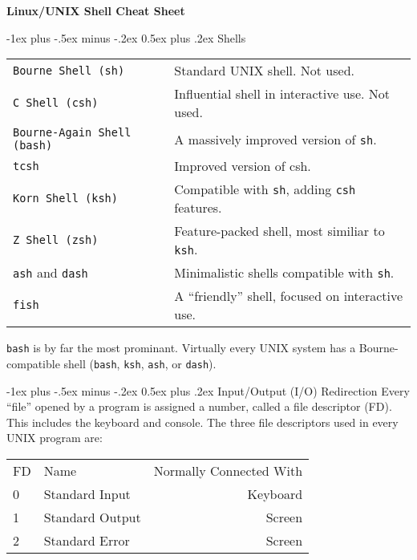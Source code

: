 \documentclass[10pt,letterpaper]{article}
\makeatletter
\renewcommand{\section}{\@startsection{section}{1}{0mm}%
                                {-1ex plus -.5ex minus -.2ex}%
                                {0.5ex plus .2ex}%
                                {\normalfont\large\bfseries}}
\makeatother
\begin{document}
\raggedright
\footnotesize
\begin{multicols}{2}

\setlength{\premulticols}{1pt}
\setlength{\postmulticols}{1pt}
\setlength{\multicolsep}{1pt}
\setlength{\columnsep}{2pt}

\begin{center}
     \Large{\textbf{Linux/UNIX Shell Cheat Sheet}} \\
\end{center}


\section{Shells}
\begin{tabular}{@{}ll@{}}
\verb!Bourne Shell (sh)! & Standard UNIX shell. Not used.\\
\verb!C Shell (csh)! & Influential shell in interactive use. Not used.\\
\verb!Bourne-Again Shell (bash)! & A massively improved version of \verb|sh|.\\
\verb!tcsh! & Improved version of csh.\\
\verb!Korn Shell (ksh)! & Compatible with \verb!sh!, adding \verb!csh! features.\\
\verb!Z Shell (zsh)! & Feature-packed shell, most similiar to \verb!ksh!.\\
\verb!ash! and \verb!dash! & Minimalistic shells compatible with \verb!sh!.\\
\verb!fish! & A ``friendly'' shell, focused on interactive use.\\
\end{tabular}

\verb!bash! is by far the most prominant. Virtually every UNIX system has a Bourne-compatible shell (\verb!bash!, \verb!ksh!, \verb!ash!, or \verb!dash!).

\section{Input/Output (I/O) Redirection}
Every ``file'' opened by a program is assigned a number, called a file descriptor (FD). This includes the keyboard and console. The three file descriptors used in every UNIX program are:
\begin{tabular}{@{}llr@{}}
	\toprule
	FD & Name & Normally Connected With\\
	0 & Standard Input & Keyboard\\
	1 & Standard Output & Screen\\
	2 & Standard Error & Screen\\
	\bottomrule
\end{tabular}



\end{multicols}
\end{document}
